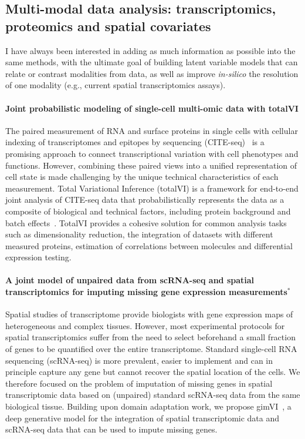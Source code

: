 \subsection[Multi-modal data analysis]{Multi-modal data analysis: transcriptomics, proteomics and spatial covariates}
I have always been interested in adding as much information as possible into the same methods, with the ultimate goal of building latent variable models that can relate or contrast modalities from data, as well as improve \textit{in-silico} the resolution of one modality (e.g., current spatial transcriptomics assays).

\paragraph{Joint probabilistic modeling of single-cell multi-omic data with totalVI} The paired measurement of RNA and surface proteins in single cells with cellular indexing of transcriptomes and epitopes by sequencing (CITE-seq)~\cite{stoeckius.simultaneous} is a promising approach to connect transcriptional variation with cell phenotypes and functions. However, combining these paired views into a unified representation of cell state is made challenging by the unique technical characteristics of each measurement. Total Variational Inference (totalVI) is a framework for end-to-end joint analysis of CITE-seq data that probabilistically represents the data as a composite of biological and technical factors, including protein background and batch effects~\cite{totalvi}. TotalVI provides a cohesive solution for common analysis tasks such as dimensionality reduction, the integration of datasets with different measured proteins, estimation of correlations between molecules and differential expression testing.

\paragraph{A joint model of unpaired data from scRNA-seq and spatial transcriptomics for imputing missing gene expression measurements$^*$}
Spatial studies of transcriptome provide biologists with gene expression maps of heterogeneous and complex tissues. However, most experimental protocols for spatial transcriptomics suffer from the need to select beforehand a small fraction of genes to be quantified over the entire transcriptome. Standard single-cell RNA sequencing (scRNA-seq) is more prevalent, easier to implement and can in principle capture any gene but cannot recover the spatial location of the cells. We therefore focused on the problem of imputation of missing genes in spatial transcriptomic data based on (unpaired) standard scRNA-seq data from the same biological tissue. Building upon domain adaptation work, we propose gimVI~\cite{lopez.joint}, a deep generative model for the integration of spatial transcriptomic data and scRNA-seq data that can be used to impute missing genes. 

